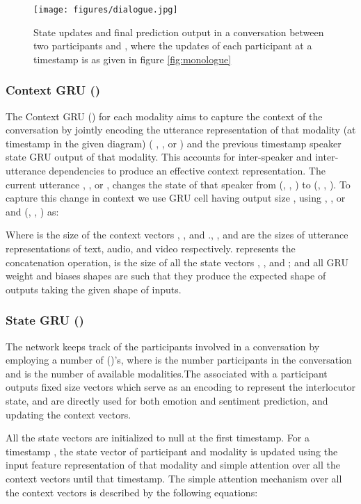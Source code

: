 \documentclass[11pt,a4paper]{article}
\begin{document}
\begin{figure*}[htbp]
	\centering
		\texttt{[image: figures/dialogue.jpg]}    
    \caption[attention]{State updates and final prediction output in a conversation between two participants  and , where the updates of each participant at a timestamp is as given in figure \ref{fig:monologue}}
	\label{fig:dialogue}
\end{figure*}

\subsubsection{Context GRU ()}
The Context GRU () for each modality aims to capture the context of the conversation by jointly encoding the utterance representation of that modality (at timestamp  in the given diagram) ( , , or ) and the previous timestamp speaker state GRU output of that modality. This accounts for inter-speaker and inter-utterance dependencies to produce an effective context representation. The current utterance , , or ,  changes the state of that speaker from (, , ) to (, , ). To capture this change in context we use GRU cell  having output size , using , , or  and (, , ) as:







Where  is the size of the context vectors , , and ., , and  are the sizes of utterance representations of text, audio, and video respectively. represents the concatenation operation,  is the size of all the state vectors , , and ; and all GRU weight and biases shapes are such that they produce the expected shape of outputs taking the given shape of inputs.  

\subsubsection{State GRU ()}
The network keeps track of the participants involved in a conversation by employing a  number of ()'s, where  is the number participants in the conversation and  is the number of available modalities.The  associated with a participant outputs fixed size vectors which serve as an encoding to represent the interlocutor state, and are directly used for both emotion and sentiment prediction, and updating the context vectors.

All the state vectors are initialized to null at the first timestamp. For a timestamp , the state vector of participant  and modality  is updated using the input feature representation of that modality and simple attention over all the context vectors until that timestamp. The simple attention mechanism over all the context vectors is described by the following equations:
\end{document}
